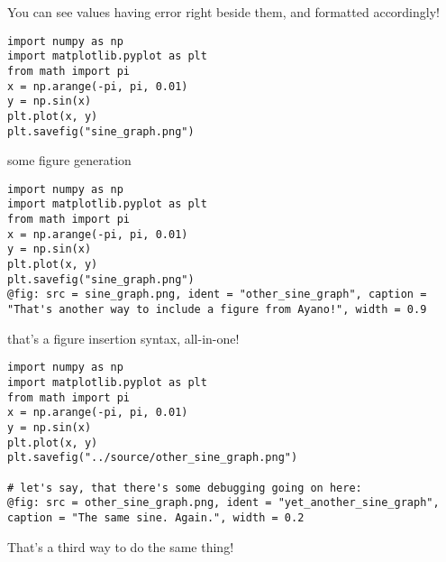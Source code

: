 \documentclass[a4paper]{article}
\begin{document}
You can see values having error right beside them, and formatted accordingly! \\

\begin{verbatim}
import numpy as np
import matplotlib.pyplot as plt
from math import pi
x = np.arange(-pi, pi, 0.01)
y = np.sin(x)
plt.plot(x, y)
plt.savefig("sine_graph.png")
\end{verbatim}

some figure generation \\

\begin{verbatim}
import numpy as np
import matplotlib.pyplot as plt
from math import pi
x = np.arange(-pi, pi, 0.01)
y = np.sin(x)
plt.plot(x, y)
plt.savefig("sine_graph.png")
@fig: src = sine_graph.png, ident = "other_sine_graph", caption = "That's another way to include a figure from Ayano!", width = 0.9
\end{verbatim}

that's a figure insertion syntax, all-in-one! \\

\begin{verbatim}
import numpy as np
import matplotlib.pyplot as plt
from math import pi
x = np.arange(-pi, pi, 0.01)
y = np.sin(x)
plt.plot(x, y)
plt.savefig("../source/other_sine_graph.png")

# let's say, that there's some debugging going on here:
@fig: src = other_sine_graph.png, ident = "yet_another_sine_graph", caption = "The same sine. Again.", width = 0.2
\end{verbatim}

That's a third way to do the same thing! \\
\end{document}
